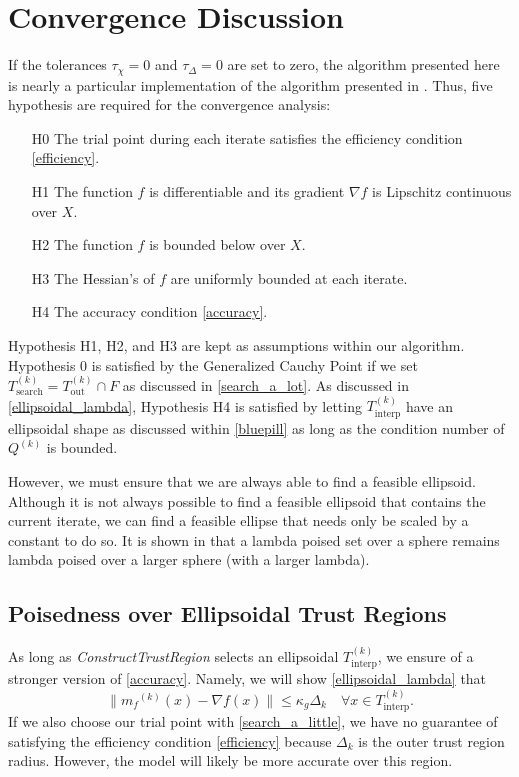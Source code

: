 \documentclass{article}
\theoremstyle{case}
\newcommand{\domain}{X}
\newcommand{\modelk}{{{m}_f}^{(k)}}
\newcommand{\outertrk}{{T_{\text{out}}^{(k)}}}
\newcommand{\searchtrk}{{T_{\text{search}}^{(k)}}}
\newcommand{\sampletrk}{{T_{\text{interp}}^{(k)}}}
\newcommand{\feasible}{{F}}
\newcommand{\qk}{{Q^{(k)}}}
\begin{document}
\color{black}


\section{Convergence Discussion}
\label{convergence_discussion}

If the tolerances $\tau_{\chi} = 0$ and $\tau_{\Delta} = 0$ are set to zero, the algorithm presented here is nearly a particular implementation of the algorithm presented in \cite{doi:10.1080/10556788.2015.1026968}.
Thus, five hypothesis are required for the convergence analysis:

\begin{itemize}
\item[H0] The trial point during each iterate satisfies the efficiency condition \cref{efficiency}.
\item[H1] The function $f$ is differentiable and its gradient $\nabla f$ is Lipschitz continuous over $\domain$.
\item[H2] The function $f$ is bounded below over $\domain$.
\item[H3] The Hessian's of $f$ are uniformly bounded at each iterate.
\item[H4] The accuracy condition \cref{accuracy}.
\end{itemize}

Hypothesis H1, H2, and H3 are kept as assumptions within our algorithm.
Hypothesis 0 is satisfied by the Generalized Cauchy Point \cite{Conn:2000:TM:357813} if we set $\searchtrk = \outertrk \cap \feasible$ as discussed in \cref{search_a_lot}.
As discussed in \cref{ellipsoidal_lambda}, Hypothesis H4 is satisfied by letting $\sampletrk$ have an ellipsoidal shape as discussed within \cref{bluepill} as long as the condition number of $\qk$ is bounded.

However, we must ensure that we are always able to find a feasible ellipsoid.
Although it is not always possible to find a feasible ellipsoid that contains the current iterate,
we can find a feasible ellipse that needs only be scaled by a constant to do so.
It is shown in \cite{Billups_Larson_2013} that a lambda poised set over a sphere remains lambda poised over a larger sphere (with a larger lambda).


\subsection{Poisedness over Ellipsoidal Trust Regions}

As long as \emph{ConstructTrustRegion} selects an ellipsoidal $ \sampletrk $, we ensure of a stronger version of \cref{accuracy}.
Namely, we will show \cref{ellipsoidal_lambda} that 
\[
    \|\modelk(x) - \nabla f(x) \| \le \kappa_g \Delta_{k} \quad \forall x \in \sampletrk.
\]
If we also choose our trial point with \cref{search_a_little}, we have no guarantee of satisfying the efficiency condition \cref{efficiency} because $\Delta_k$ is the outer trust region radius.
However, the model will likely be more accurate over this region.
\end{document}
